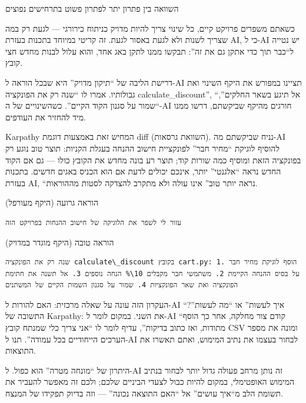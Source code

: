 \begin{center}\small\color{gray}השוואה בין פתרון יתר לפתרון פשוט בתרחישים נפוצים\end{center}


כשאתם משפרים פרויקט קיים, כל שינוי צריך להיות מדויק כניתוח כירורגי — לגעת רק במה שצריך לשנות ולא לגעת באסור לגעת. זה קריטי במיוחד בתכנות בעזרת AI, כי ל-AI יש נטייה ל“כבר תוך כדי אתקן גם את זה”: תבקשו ממנו לתקן באג אחד, והוא עלול לבנות מחדש חצי קובץ.

דרישת הליבה של “תיקון מדויק” היא שבכל הוראה ל-AI תציינו במפורש את היקף השינוי ואת גבולותיו. אמרו לו “שנה רק את הפונקציה calculate\_discount”, “אל תיגע בשאר החלקים”, “שמור על סגנון הקוד הקיים”. כשהשינויים של ה-AI חורגים מהיקף שביקשתם, דרשו ממנו מיד להחזיר את העודפים.

Karpathy המחיש זאת באמצעות דוגמת diff (השוואת גרסאות). נניח שביקשתם מה-AI להוסיף לוגיקת “מחיר חבר” לפונקציית חישוב ההנחה בעגלת הקניות: תוצר טוב נוגע רק בפונקציה הזאת ומוסיף כמה שורות קוד; תוצר רע בונה מחדש את הקובץ כולו — גם אם הקוד החדש נראה “אלגנטי” יותר, אינכם יכולים לדעת אם הוא הכניס באגים חדשים. בתכנות בעזרת AI, “נראה יותר טוב” אינו עולה ולא מתקרב להצדקה לסטות מההוראות.

הוראה גרועה (היקף מעורפל)

\begin{lstlisting}
עזור לי לשפר את הלוגיקה של חישוב ההנחות בפרויקט הזה
\end{lstlisting}

הוראה טובה (היקף מוגדר במדויק)

\begin{lstlisting}
שנה רק את הפונקציה calculate\_discount בקובץ cart.py: 1. הוסף לוגיקת מחיר חבר על בסיס ההנחה הקיימת 2. משתמשי חבר מקבלים 10\% הנחה נוספים 3. אל תשנה את חתימת הפונקציה ואת שאר הפונקציות 4. שמור על סגנון השמות הקיים של המשתנים
\end{lstlisting}


העקרון הזה עונה על שאלה מרכזית: האם להורות ל-AI “איך לעשות” או “מה לעשות”? התשובה של Karpathy: את השני. במקום לומר ל-AI “קודם צור מחלקה, אחר כך הוסף מתודות, ואז כתוב בדיקות”, עדיף לומר לו “אני צריך כלי שמנתח קובץ CSV ומונה את מספר הערכים הייחודיים בכל עמודה”. תנו ל-AI לבחור בעצמו את נתיב המימוש, ואתם תאשרו את התוצאות.

היתרון של “מונחה מטרה” הוא כפול. ל-AI זה נותן מרחב פעולה גדול יותר לבחור בנתיב המימוש האופטימלי, במקום להיות כבול לצעדי הביניים שלכם; ולכם זה מאפשר להעביר את תשומת הלב מ“איך עושים” אל “האם התוצאה נכונה” — וזה בדיוק תפקידו של המנצח.

